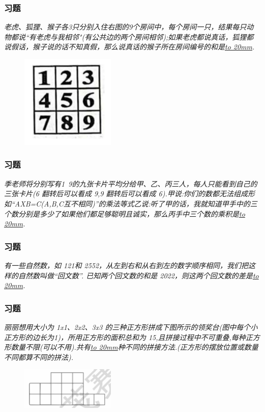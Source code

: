 \begin{frame}
    \frametitle{习题\theframecounter}
    \textit{老虎、狐狸、猴子各3只分别入住右图的9个房间中，每个房间一只，结果每只动物都说“有老虎与我相邻"(有公共边的两个房间相邻);如果老虎都说真话，狐狸都说假话，猴子说的话不知真假，那么说真话的猴子所在房间编号的和是\underline{\hbox to 20mm{}}.}
    \begin{figure}[H] 
        \centering
        \includegraphics[width=0.4\textwidth]{./pics/Chapter_7/4.png}
    \end{figure}
\end{frame}

\begin{frame}
    \frametitle{习题\theframecounter}
    \textit{季老师将分别写有1~9的九张卡片平均分给甲、乙、丙三人，每人只能看到自己的三张卡片(6 翻转后可以看成 9,9 翻转后可以看成 6).甲说:你们的数都无法组成形如“AXB=C(A,B,C互不相同)”的乘法等式乙说:听了甲的话，我就知道甲手中的三个数分别是多少了如果他们都足够聪明且诚实，那么丙手中三个数的乘积是\underline{\hbox to 20mm{}}.}
\end{frame}

\begin{frame}
    \frametitle{习题\theframecounter}
    \textit{有一些自然数，如 121和 2552，从左到右和从右到左的数字顺序相同，我们把这样的自然数叫做“回文数”. 已知两个回文数的和是 2022，则这两个回文数的差是\underline{\hbox to 20mm{}}.}
\end{frame}


\begin{frame}
    \frametitle{习题\theframecounter}
    \textit{丽丽想用大小为 1x1、2x2、3x3 的三种正方形拼成下图所示的领奖台(图中每个小正方形的边长为1)，所用正方形的面积总和为 15,且拼接过程中不可重叠,每种正方形数量不限(可以不用).共有\underline{\hbox to 20mm{}}种不同的拼接方法.(正方形的摆放位置或数量不同都算不同的拼法).}
    \begin{figure}[H] 
        \centering
        \includegraphics[width=0.4\textwidth]{./pics/Chapter_7/7.png}
    \end{figure}
\end{frame}

